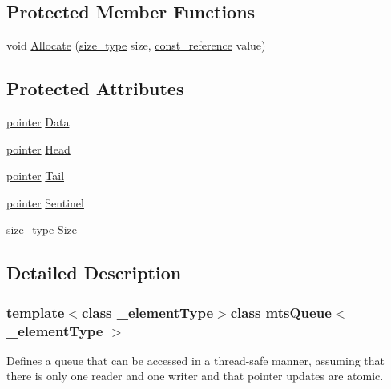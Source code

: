 \subsection*{Protected Member Functions}
\begin{DoxyCompactItemize}
\item 
void \hyperlink{classmts_queue_a70acf931defef26481f1065cfd2f7e01}{Allocate} (\hyperlink{classmts_queue_a41b33537b89ae654421ba5e7c9893ed2}{size\+\_\+type} size, \hyperlink{classmts_queue_a3ae67f8b6cdb9686e5fca9ed1740290e}{const\+\_\+reference} value)
\end{DoxyCompactItemize}
\subsection*{Protected Attributes}
\begin{DoxyCompactItemize}
\item 
\hyperlink{classmts_queue_a66d423ede5c12e015a4e070e1bc23f43}{pointer} \hyperlink{classmts_queue_a7967ce45474f4266531201ec0ff65480}{Data}
\item 
\hyperlink{classmts_queue_a66d423ede5c12e015a4e070e1bc23f43}{pointer} \hyperlink{classmts_queue_a9d7bee24b9b1e45e318dee474d66f12c}{Head}
\item 
\hyperlink{classmts_queue_a66d423ede5c12e015a4e070e1bc23f43}{pointer} \hyperlink{classmts_queue_a3fc27909e8863597f5cc79288f555a9d}{Tail}
\item 
\hyperlink{classmts_queue_a66d423ede5c12e015a4e070e1bc23f43}{pointer} \hyperlink{classmts_queue_aa80fac3217d8148da5383e6fe9ac0fa4}{Sentinel}
\item 
\hyperlink{classmts_queue_a41b33537b89ae654421ba5e7c9893ed2}{size\+\_\+type} \hyperlink{classmts_queue_ac479b4223b71cdc7f9b49325e91ab6c6}{Size}
\end{DoxyCompactItemize}


\subsection{Detailed Description}
\subsubsection*{template$<$class \+\_\+element\+Type$>$class mts\+Queue$<$ \+\_\+element\+Type $>$}

Defines a queue that can be accessed in a thread-\/safe manner, assuming that there is only one reader and one writer and that pointer updates are atomic. 

